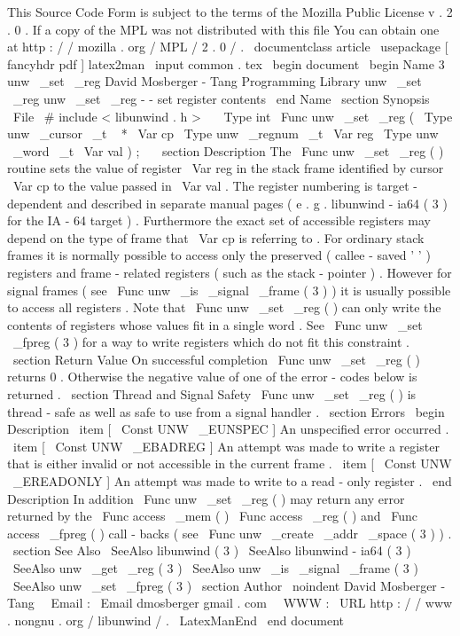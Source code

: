 %
This
Source
Code
Form
is
subject
to
the
terms
of
the
Mozilla
Public
%
License
v
.
2
.
0
.
If
a
copy
of
the
MPL
was
not
distributed
with
this
%
file
You
can
obtain
one
at
http
:
/
/
mozilla
.
org
/
MPL
/
2
.
0
/
.
\
documentclass
{
article
}
\
usepackage
[
fancyhdr
pdf
]
{
latex2man
}
\
input
{
common
.
tex
}
\
begin
{
document
}
\
begin
{
Name
}
{
3
}
{
unw
\
_set
\
_reg
}
{
David
Mosberger
-
Tang
}
{
Programming
Library
}
{
unw
\
_set
\
_reg
}
unw
\
_set
\
_reg
-
-
set
register
contents
\
end
{
Name
}
\
section
{
Synopsis
}
\
File
{
\
#
include
<
libunwind
.
h
>
}
\
\
\
Type
{
int
}
\
Func
{
unw
\
_set
\
_reg
}
(
\
Type
{
unw
\
_cursor
\
_t
~
*
}
\
Var
{
cp
}
\
Type
{
unw
\
_regnum
\
_t
}
\
Var
{
reg
}
\
Type
{
unw
\
_word
\
_t
}
\
Var
{
val
}
)
;
\
\
\
section
{
Description
}
The
\
Func
{
unw
\
_set
\
_reg
}
(
)
routine
sets
the
value
of
register
\
Var
{
reg
}
in
the
stack
frame
identified
by
cursor
\
Var
{
cp
}
to
the
value
passed
in
\
Var
{
val
}
.
The
register
numbering
is
target
-
dependent
and
described
in
separate
manual
pages
(
e
.
g
.
libunwind
-
ia64
(
3
)
for
the
IA
-
64
target
)
.
Furthermore
the
exact
set
of
accessible
registers
may
depend
on
the
type
of
frame
that
\
Var
{
cp
}
is
referring
to
.
For
ordinary
stack
frames
it
is
normally
possible
to
access
only
the
preserved
(
callee
-
saved
'
'
)
registers
and
frame
-
related
registers
(
such
as
the
stack
-
pointer
)
.
However
for
signal
frames
(
see
\
Func
{
unw
\
_is
\
_signal
\
_frame
}
(
3
)
)
it
is
usually
possible
to
access
all
registers
.
Note
that
\
Func
{
unw
\
_set
\
_reg
}
(
)
can
only
write
the
contents
of
registers
whose
values
fit
in
a
single
word
.
See
\
Func
{
unw
\
_set
\
_fpreg
}
(
3
)
for
a
way
to
write
registers
which
do
not
fit
this
constraint
.
\
section
{
Return
Value
}
On
successful
completion
\
Func
{
unw
\
_set
\
_reg
}
(
)
returns
0
.
Otherwise
the
negative
value
of
one
of
the
error
-
codes
below
is
returned
.
\
section
{
Thread
and
Signal
Safety
}
\
Func
{
unw
\
_set
\
_reg
}
(
)
is
thread
-
safe
as
well
as
safe
to
use
from
a
signal
handler
.
\
section
{
Errors
}
\
begin
{
Description
}
\
item
[
\
Const
{
UNW
\
_EUNSPEC
}
]
An
unspecified
error
occurred
.
\
item
[
\
Const
{
UNW
\
_EBADREG
}
]
An
attempt
was
made
to
write
a
register
that
is
either
invalid
or
not
accessible
in
the
current
frame
.
\
item
[
\
Const
{
UNW
\
_EREADONLY
}
]
An
attempt
was
made
to
write
to
a
read
-
only
register
.
\
end
{
Description
}
In
addition
\
Func
{
unw
\
_set
\
_reg
}
(
)
may
return
any
error
returned
by
the
\
Func
{
access
\
_mem
}
(
)
\
Func
{
access
\
_reg
}
(
)
and
\
Func
{
access
\
_fpreg
}
(
)
call
-
backs
(
see
\
Func
{
unw
\
_create
\
_addr
\
_space
}
(
3
)
)
.
\
section
{
See
Also
}
\
SeeAlso
{
libunwind
(
3
)
}
\
SeeAlso
{
libunwind
-
ia64
(
3
)
}
\
SeeAlso
{
unw
\
_get
\
_reg
(
3
)
}
\
SeeAlso
{
unw
\
_is
\
_signal
\
_frame
(
3
)
}
\
SeeAlso
{
unw
\
_set
\
_fpreg
(
3
)
}
\
section
{
Author
}
\
noindent
David
Mosberger
-
Tang
\
\
Email
:
\
Email
{
dmosberger
gmail
.
com
}
\
\
WWW
:
\
URL
{
http
:
/
/
www
.
nongnu
.
org
/
libunwind
/
}
.
\
LatexManEnd
\
end
{
document
}
